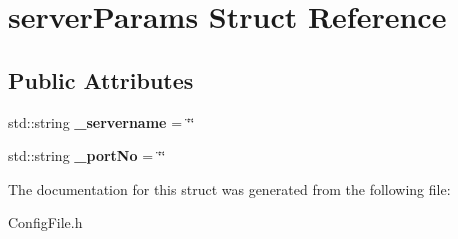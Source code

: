 \hypertarget{structserverParams}{\section{server\-Params Struct Reference}
\label{structserverParams}
}
\subsection*{Public Attributes}
\begin{DoxyCompactItemize}
\item 
\hypertarget{structserverParams_a9acca3960089e8feda7c75f692f33350}{std\-::string {\bfseries \-\_\-servername} = \char`\"{}\char`\"{}}\label{structserverParams_a9acca3960089e8feda7c75f692f33350}

\item 
\hypertarget{structserverParams_ad2dd4bd8923b6843674c68d410c82a65}{std\-::string {\bfseries \-\_\-port\-No} = \char`\"{}\char`\"{}}\label{structserverParams_ad2dd4bd8923b6843674c68d410c82a65}

\end{DoxyCompactItemize}


The documentation for this struct was generated from the following file\-:\begin{DoxyCompactItemize}
\item 
Config\-File.\-h\end{DoxyCompactItemize}
